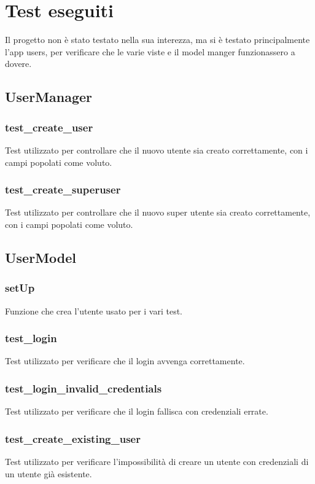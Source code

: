 \section{Test eseguiti}

Il progetto non è stato testato nella sua interezza, ma si è testato principalmente l'app users,
per verificare che le varie viste e il model manger funzionassero a dovere.

\subsection{UserManager}
\subsubsection{test\_create\_user}
Test utilizzato per controllare che il nuovo utente sia creato correttamente, con i campi popolati come voluto.

\subsubsection{test\_create\_superuser}
Test utilizzato per controllare che il nuovo super utente sia creato correttamente, con i campi popolati come voluto.


\subsection{UserModel}
\subsubsection{setUp}
Funzione che crea l'utente usato per i vari test.

\subsubsection{test\_login}
Test utilizzato per verificare che il login avvenga correttamente.

\subsubsection{test\_login\_invalid\_credentials}
Test utilizzato per verificare che il login fallisca con credenziali errate.

\subsubsection{test\_create\_existing\_user}
Test utilizzato per verificare l'impossibilità di creare un utente con credenziali di un utente già esistente.

